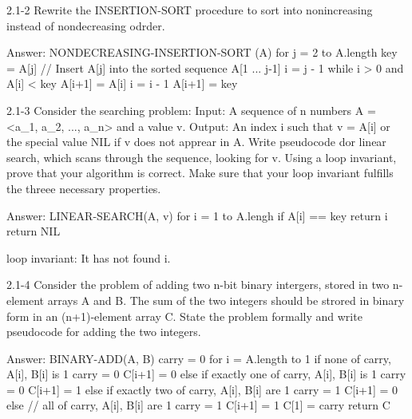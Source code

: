 2.1-2
Rewrite the INSERTION-SORT procedure to sort into nonincreasing instead of nondecreasing odrder.

Answer:
NONDECREASING-INSERTION-SORT (A)
  for j = 2 to A.length
    key = A[j]
    // Insert A[j] into the sorted sequence A[1 ... j-1]
    i = j - 1
    while i > 0 and A[i] < key
      A[i+1] = A[i]
      i = i - 1
    A[i+1] = key
    
2.1-3
Consider the searching problem:
  Input: A sequence of n numbers A = <a_1, a_2, ..., a_n> and a value v.
  Output: An index i such that v = A[i] or the special value NIL if v does not apprear in A.
Write pseudocode dor linear search, which scans through the sequence, looking for v. Using a loop invariant, prove that your algorithm is correct. Make sure that your loop invariant fulfills the threee necessary properties.

Answer:
LINEAR-SEARCH(A, v)
  for i = 1 to A.lengh
    if A[i] == key
      return i
  return NIL
  
loop invariant: It has not found i.
  
2.1-4
Consider the problem of adding two n-bit binary intergers, stored in two n-element arrays A and B. The sum of the two integers should be strored in binary form in an (n+1)-element array C. State the problem formally and write pseudocode for adding the two integers.

Answer:
BINARY-ADD(A, B)
  carry = 0
  for i = A.length to 1
    if none of carry, A[i], B[i] is 1
      carry = 0
      C[i+1] = 0
    else if exactly one of carry, A[i], B[i] is 1
      carry = 0
      C[i+1] = 1
    else if exactly two of carry, A[i], B[i] are 1
      carry = 1
      C[i+1] = 0
    else  // all of carry, A[i], B[i] are 1
      carry = 1
      C[i+1] = 1
  C[1] = carry
  return C

